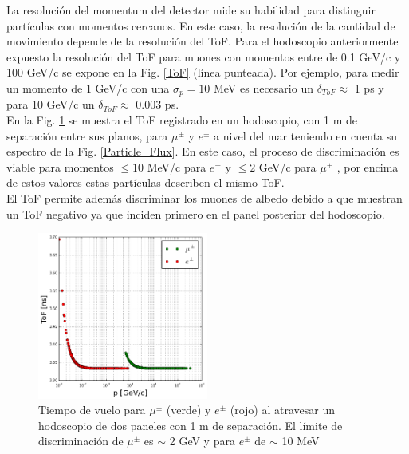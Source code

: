 La resolución del momentum del detector mide su habilidad para distinguir partículas con momentos cercanos. En este caso, la resolución de la cantidad de movimiento depende de la resolución del ToF. Para el hodoscopio anteriormente expuesto la resolución del ToF para muones con momentos entre de 0.1 GeV/c y 100 GeV/c se expone en la Fig. \ref{ToF} (línea punteada). Por ejemplo, para medir un momento de 1 GeV/c con una $\sigma_p = 10$ MeV es necesario un $\delta_{ToF}\approx$ 1 ps y para 10 GeV/c un $\delta_{ToF}\approx$ 0.003 ps.\\


En la Fig. \ref{ToF_mue} se muestra el ToF registrado en un hodoscopio, con 1 m de separación entre sus planos, para $\mu^{\pm}$ y $e^{\pm}$ a nivel del mar teniendo en cuenta su espectro de la Fig. \ref{Particle_Flux}. En este caso, el proceso de discriminación es viable para momentos $\le 10$ MeV/c para $e^{\pm}$ y $\le 2$ GeV/c para $\mu^{\pm}$ , por encima de estos valores estas partículas describen el mismo ToF. \\

El ToF permite además discriminar los muones de albedo debido a que muestran un ToF negativo ya que inciden primero en el panel posterior del hodoscopio.

\begin{figure}[h!]
\begin{center}
\includegraphics[width=0.5\textwidth]{Figures/ToF_Spec.png}
\caption{Tiempo de vuelo para $\mu^{\pm}$ (verde) y $e^{\pm}$ (rojo) al atravesar un hodoscopio de dos paneles con 1 m de separación. El límite de discriminación de $\mu^{\pm}$ es $\sim$ 2 GeV y para $e^{\pm}$ de $\sim$ 10 MeV}
\label{ToF_mue}
\end{center}
\end{figure}
 
